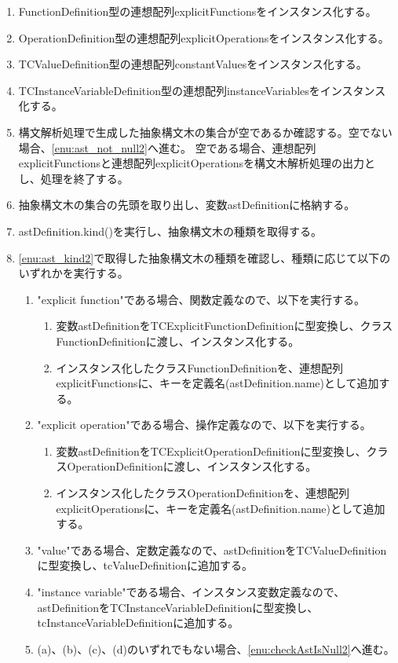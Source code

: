 \documentclass[uplatex, report, a4j, 10pt]{jsbook}
\begin{document}
\begin{enumerate}
  \item FunctionDefinition型の連想配列explicitFunctionsをインスタンス化する。
  \item OperationDefinition型の連想配列explicitOperationsをインスタンス化する。
  \item TCValueDefinition型の連想配列constantValuesをインスタンス化する。
  \item TCInstanceVariableDefinition型の連想配列instanceVariablesをインスタンス化する。
  \item\label{enu:checkAstIsNull2} 構文解析処理で生成した抽象構文木の集合が空であるか確認する。空でない場合、\ref{enu:ast_not_null2}へ進む。
        空である場合、連想配列explicitFunctionsと連想配列explicitOperationsを構文木解析処理の出力とし、処理を終了する。
  \item\label{enu:ast_not_null2} 抽象構文木の集合の先頭を取り出し、変数astDefinitionに格納する。
  \item\label{enu:ast_kind2} astDefinition.kind()を実行し、抽象構文木の種類を取得する。
  \item \ref{enu:ast_kind2}で取得した抽象構文木の種類を確認し、種類に応じて以下のいずれかを実行する。
        \begin{enumerate}
          \item "explicit function"である場合、関数定義なので、以下を実行する。
                \begin{enumerate}
                  \item 変数astDefinitionをTCExplicitFunctionDefinitionに型変換し、クラスFunctionDefinitionに渡し、インスタンス化する。
                  \item インスタンス化したクラスFunctionDefinitionを、連想配列explicitFunctionsに、キーを定義名(astDefinition.name)として追加する。
                \end{enumerate}
          \item "explicit operation"である場合、操作定義なので、以下を実行する。
                \begin{enumerate}
                  \item 変数astDefinitionをTCExplicitOperationDefinitionに型変換し、クラスOperationDefinitionに渡し、インスタンス化する。
                  \item インスタンス化したクラスOperationDefinitionを、連想配列explicitOperationsに、キーを定義名(astDefinition.name)として追加する。
                \end{enumerate}
          \item "value"である場合、定数定義なので、astDefinitionをTCValueDefinitionに型変換し、tcValueDefinitionに追加する。
          \item "instance variable"である場合、インスタンス変数定義なので、astDefinitionをTCInstanceVariableDefinitionに型変換し、tcInstanceVariableDefinitionに追加する。
          \item (a)、(b)、(c)、(d)のいずれでもない場合、\ref{enu:checkAstIsNull2}へ進む。
        \end{enumerate}
\end{enumerate}
\end{document}
